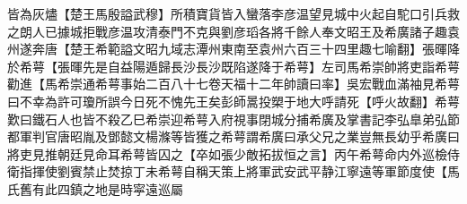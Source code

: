 皆為灰燼【楚王馬殷謚武穆】所積寶貨皆入蠻落李彦温望見城中火起自駝口引兵救之朗人已據城拒戰彦温攻清泰門不克與劉彦瑫各將千餘人奉文昭王及希廣諸子趣袁州遂奔唐【楚王希範謚文昭九域志潭州東南至袁州六百三十四里趣七喻翻】張暉降於希萼【張暉先是自益陽遁歸長沙長沙既陷遂降于希萼】左司馬希崇帥將吏詣希萼勸進【馬希崇通希萼事始二百八十七卷天福十二年帥讀曰率】吳宏戰血滿袖見希萼曰不幸為許可瓊所誤今日死不愧先王矣彭師暠投槊于地大呼請死【呼火故翻】希萼歎曰鐵石人也皆不殺乙巳希崇迎希萼入府視事閉城分捕希廣及掌書記李弘臯弟弘節都軍判官唐昭胤及鄧懿文楊滌等皆獲之希萼謂希廣曰承父兄之業豈無長幼乎希廣曰將吏見推朝廷見命耳希萼皆囚之【卒如張少敵拓拔恒之言】丙午希萼命内外巡檢侍衛指揮使劉賓禁止焚掠丁未希萼自稱天策上將軍武安武平静江寧遠等軍節度使【馬氏舊有此四鎮之地是時寜遠巡屬